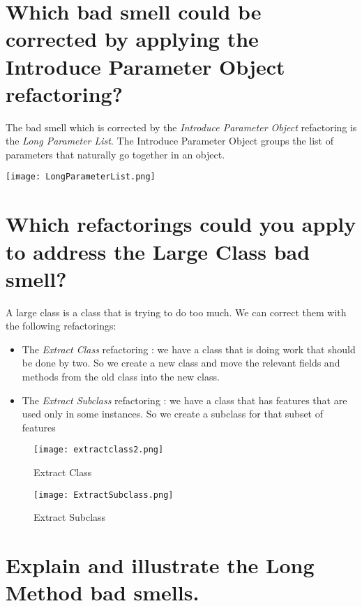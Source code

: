 \section{Which bad smell could be corrected by applying the Introduce Parameter Object
refactoring?}

The bad smell which is corrected by the \textit{Introduce Parameter Object} refactoring is the \textit{Long Parameter List}. The Introduce Parameter Object groups the list of parameters  that naturally go together in an object.

\begin{center}
\texttt{[image: LongParameterList.png]}
\end{center}

\section{Which refactorings could you apply to address the Large Class bad smell?}

A large class is a class that is trying to do too much.  We can correct them with the following refactorings:

\begin{itemize}
\item  The \textit{Extract Class} refactoring : we have a class that is doing work that should be done by two. So we create a new class and move the relevant fields and methods from the old class into the new class.
\item The \textit{Extract Subclass} refactoring : we have a class that has features that are used only in some instances. So we create a subclass for that subset of features
\end{itemize}

\begin{figure}[!ht]
  \centering
  \begin{minipage}[b]{0.4\textwidth}
    \texttt{[image: extractclass2.png]}
    \caption{Extract Class}
  \end{minipage}
  \hfill
  \begin{minipage}[b]{0.4\textwidth}
    \texttt{[image: ExtractSubclass.png]}
    \caption{Extract Subclass}
  \end{minipage}
\end{figure}

\section{Explain and illustrate the Long Method bad smells.}

